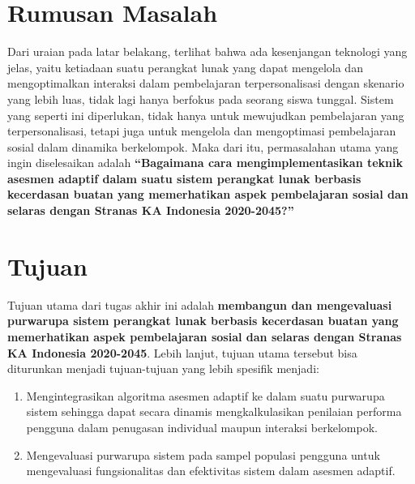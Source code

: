\documentclass[12pt,a4paper,oneside]{book}
\begin{document}
\section{Rumusan Masalah}
Dari uraian pada latar belakang, terlihat bahwa ada kesenjangan teknologi yang jelas, yaitu ketiadaan suatu perangkat lunak yang dapat mengelola dan mengoptimalkan interaksi dalam pembelajaran terpersonalisasi dengan skenario yang lebih luas, tidak lagi hanya berfokus pada seorang siswa tunggal. Sistem yang seperti ini diperlukan, tidak hanya untuk mewujudkan pembelajaran yang terpersonalisasi, tetapi juga untuk mengelola dan mengoptimasi pembelajaran sosial dalam dinamika berkelompok. Maka dari itu, permasalahan utama yang ingin diselesaikan adalah \textbf{“Bagaimana cara mengimplementasikan teknik asesmen adaptif dalam suatu sistem perangkat lunak berbasis kecerdasan buatan yang memerhatikan aspek pembelajaran sosial dan selaras dengan Stranas KA Indonesia 2020-2045?”}

\section{Tujuan}
Tujuan utama dari tugas akhir ini adalah \textbf{membangun dan mengevaluasi purwarupa sistem perangkat lunak berbasis kecerdasan buatan yang memerhatikan aspek pembelajaran sosial dan selaras dengan Stranas KA Indonesia 2020-2045}. Lebih lanjut, tujuan utama tersebut bisa diturunkan menjadi tujuan-tujuan yang lebih spesifik menjadi:
\begin{enumerate}
\item Mengintegrasikan algoritma asesmen adaptif ke dalam suatu purwarupa sistem sehingga dapat secara dinamis mengkalkulasikan penilaian performa pengguna dalam penugasan individual maupun interaksi berkelompok.
\item Mengevaluasi purwarupa sistem pada sampel populasi pengguna untuk mengevaluasi fungsionalitas dan efektivitas sistem dalam asesmen adaptif.
\end{enumerate}
\end{document}
